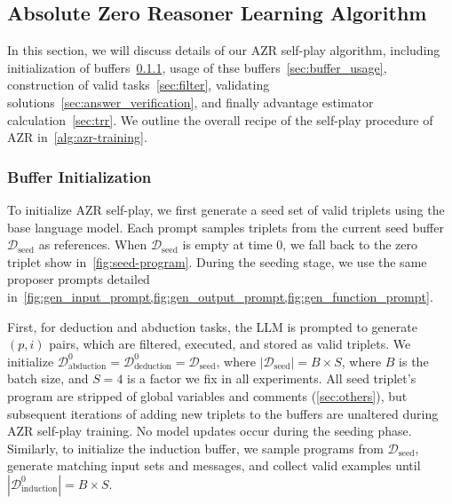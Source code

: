 \documentclass{article}
\begin{document}
\subsection{Absolute Zero Reasoner Learning Algorithm}
\label{sec:algorithm}
In this section, we will discuss details of our AZR self-play algorithm, including initialization of buffers~\ref{sec:seed}, usage of thse buffers~\ref{sec:buffer_usage}, construction of valid tasks~\ref{sec:filter}, validating solutions~\ref{sec:answer_verification}, and finally advantage estimator calculation~\ref{sec:trr}. We outline the overall recipe of the self-play procedure of AZR in~\cref{alg:azr-training}. 

\subsubsection{Buffer Initialization}
\label{sec:seed}

To initialize AZR self-play, we first generate a seed set of valid triplets using the base language model. Each prompt samples triplets from the current seed buffer \(\mathcal{D}_\text{seed}\) as references. When \(\mathcal{D}_\text{seed}\) is empty at time 0, we fall back to the zero triplet show in~\cref{fig:seed-program}. During the seeding stage, we use the same proposer prompts detailed in~\cref{fig:gen_input_prompt,fig:gen_output_prompt,fig:gen_function_prompt}.

First, for deduction and abduction tasks, the LLM is prompted to generate \((p, i)\) pairs, which are filtered, executed, and stored as valid triplets. We initialize \(\mathcal{D}^0_\text{abduction} = \mathcal{D}^0_\text{deduction} = \mathcal{D}_\text{seed}\), where \(|\mathcal{D}_\text{seed}| = B \times S\), where \(B\) is the batch size, and \(S=4\) is a factor we fix in all experiments. All seed triplet's program are stripped of global variables and comments (\cref{sec:others}), but subsequent iterations of adding new triplets to the buffers are unaltered during AZR self-play training. No model updates occur during the seeding phase. Similarly, to initialize the induction buffer, we sample programs from \(\mathcal{D}_\text{seed}\), generate matching input sets and messages, and collect valid examples until \(|\mathcal{D}^0_\text{induction}| = B \times S\).
\end{document}
